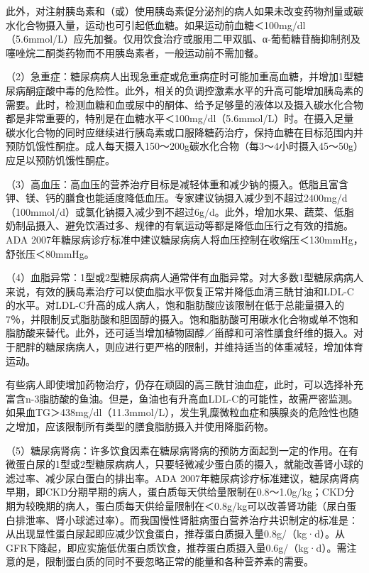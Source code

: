 此外，对注射胰岛素和（或）使用胰岛素促分泌剂的病人如果未改变药物剂量或碳水化合物摄入量，运动也可引起低血糖。如果运动前血糖＜100mg/dl（5.6mmol/L）应先加餐。仅用饮食治疗或服用二甲双胍、α-葡萄糖苷酶抑制剂及噻唑烷二酮类药物而不用胰岛素者，一般运动前不需加餐。

（2）急重症：糖尿病病人出现急重症或危重病症时可能加重高血糖，并增加1型糖尿病酮症酸中毒的危险性。此外，相关的负调控激素水平的升高可能增加胰岛素的需要。此时，检测血糖和血或尿中的酮体、给予足够量的液体以及摄入碳水化合物都是非常重要的，特别是在血糖水平＜100mg/dl（5.6mmol/L）时。在摄入足量碳水化合物的同时应继续进行胰岛素或口服降糖药治疗，保持血糖在目标范围内并预防饥饿性酮症。成人每天摄入150～200g碳水化合物（每3～4小时摄入45～50g）应足以预防饥饿性酮症。

（3）高血压：高血压的营养治疗目标是减轻体重和减少钠的摄入。低脂且富含钾、镁、钙的膳食也能适度降低血压。专家建议钠摄入减少到不超过2400mg/d（100mmol/d）或氯化钠摄入减少到不超过6g/d。此外，增加水果、蔬菜、低脂奶制品摄入、避免饮酒过多、规律的有氧运动等都是降低血压行之有效的措施。ADA
2007年糖尿病诊疗标准中建议糖尿病病人将血压控制在收缩压＜130mmHg，舒张压＜80mmHg。

（4）血脂异常：1型或2型糖尿病病人通常伴有血脂异常。对大多数1型糖尿病病人来说，有效的胰岛素治疗可以使血脂水平恢复正常并降低血清三酰甘油和LDL-C的水平。对LDL-C升高的成人病人，饱和脂肪酸应该限制在低于总能量摄入的7％，并限制反式脂肪酸和胆固醇的摄入。饱和脂肪酸可用碳水化合物或单不饱和脂肪酸来替代。此外，还可适当增加植物固醇／甾醇和可溶性膳食纤维的摄入。对于肥胖的糖尿病病人，则应进行更严格的限制，并维持适当的体重减轻，增加体育运动。

有些病人即使增加药物治疗，仍存在顽固的高三酰甘油血症，此时，可以选择补充富含n-3脂肪酸的鱼油。但是，鱼油也有升高血LDL-C的可能性，故需严密监测。如果血TG＞438mg/dl（11.3mmol/L），发生乳糜微粒血症和胰腺炎的危险性也随之增加，应该限制所有类型的膳食脂肪摄入并使用降脂药物。

（5）糖尿病肾病：许多饮食因素在糖尿病肾病的预防方面起到一定的作用。在有微蛋白尿的1型或2型糖尿病病人，只要轻微减少蛋白质的摄入，就能改善肾小球的滤过率、减少尿白蛋白的排出率。ADA
2007年糖尿病诊疗标准建议，糖尿病肾病早期，即CKD分期早期的病人，蛋白质每天供给量限制在0.8～1.0g/kg；CKD分期为较晚期的病人，蛋白质每天供给量限制在＜0.8g/kg可以改善肾功能（尿白蛋白排泄率、肾小球滤过率）。而我国慢性肾脏病蛋白营养治疗共识制定的标准是：从出现显性蛋白尿起即应减少饮食蛋白，推荐蛋白质摄入量0.8g/（kg·d）。从GFR下降起，即应实施低优蛋白质饮食，推荐蛋白质摄入量0.6g/（kg·d）。需注意的是，限制蛋白质的同时不要忽略正常的能量和各种营养素的需要。

